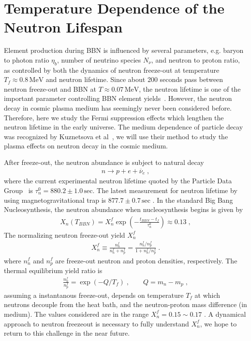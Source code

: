 
\section{Temperature Dependence of the Neutron Lifespan}

Element production during BBN is influenced by several parameters, e.g. baryon to photon ratio $\eta_b$, number of neutrino species $N_\nu$, and neutron to proton ratio, as controlled by both the dynamics of neutron freeze-out at temperature $T_f\approx 0.8\,\mathrm{MeV}$ and neutron lifetime. Since about 200 seconds pass between neutron freeze-out and BBN at $T\approx0.07\,\mathrm{MeV}$, the neutron lifetime is one of the important parameter controlling BBN element yields~\cite{Pitrou:2018cgg}. However, the neutron decay in cosmic plasma medium has seemingly never been considered before. Therefore, here we study the Fermi suppression effects which lengthen the neutron lifetime in the early universe. The medium dependence of particle decay was recognized by Kuznetsova et al~\cite{Kuznetsova:2010pi}, we will use their method to study the plasma effects on neutron decay in the cosmic medium.

After freeze-out, the neutron abundance is subject to natural decay
\begin{align}\label{Ndec}
n\longrightarrow p+e+\overline{\nu}_e\;,
\end{align}
where the current experimental neutron lifetime quoted by the Particle Data Group~\cite{Patrignani:2016xqp} is $\tau_n^0=880.2\pm1.0\,\mathrm{sec}$. The latest measurement for neutron lifetime by using magnetogravitational trap is $877.7\pm0.7\,\mathrm{sec}$ \cite{Pattie:2018vsj}. In the standard Big Bang Nucleosynthesis, the neutron abundance when nucleosynthesis begins is given by~\cite{Pitrou:2018cgg}
\begin{align}
\label{Xn_abundance}
X_n(T_{BBN})=X_n^f\exp\left(-\frac{t_{BBN}-t_f}{\tau_n^0}\right)\approx0.13\;,
\end{align}
The normalizing neutron freeze-out yield $X_n^f$ 
\begin{align}
\label{Xn_abundance2}
X_n^f \equiv  \frac{n_n^f}{n_n^f+n_p^f}= \frac{n_n^f/n_p^f}{1+n_n^f/n_p^f}\;.
\end{align}
where $n_n^f$ and $n_p^f$ are freeze-out neutron and proton densities, respectively. The thermal equilibrium yield ratio is
\begin{align}
\label{Xn_abundance3}
 \frac{n_n^f}{n_p^f}= \exp\left(-Q/T_f\right)\;,\qquad Q=m_n-m_p\;,
\end{align}
assuming a instantanous freeze-out, depends on temperature $T_f$ at which neutrons decouple from the heat bath, and the neutron-proton mass difference (in medium). The values considered  are in the range $X_n^f=0.15\sim0.17$ \cite{Pitrou:2018cgg}. A dynamical approach to neutron freezeout is necessary to fully understand $X_n^f$, we hope to return to this challenge in the near  future.


